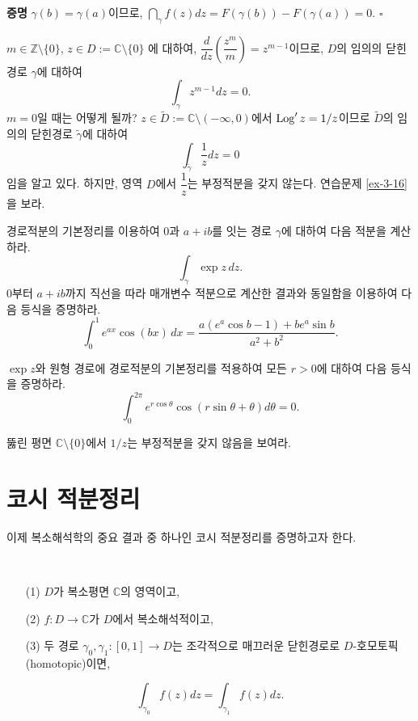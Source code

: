 {\bf 증명}
$\gamma(b)=\gamma(a)$이므로,
$\dint_\gamma f(z)dz = F(\gamma(b)) - F(\gamma(a)) = 0$.
\hfill $\square$

\begin{salt_example}\label{example-3-7}
$m\in\mathbb Z\setminus \{0\}$, $z\in D:=\mathbb C \setminus\{0\}$
에 대하여, 
$\dfrac d{dz}\left( \dfrac{z^m}m\right) = z^{m-1}$이므로,
$D$의 임의의 닫힌경로 $\gamma$에 대하여
\[
\int_\gamma z^{m-1}dz = 0.
\]
$m=0$일 때는 어떻게 될까?
$z\in\tilde D:= \mathbb C \setminus (-\infty,0)$에서
$\mathop{\mathrm{Log}}' z = 1/z$이므로 $\tilde D$의 임의의 닫힌경로 $\tilde \gamma$에 대하여
\[
\int_{\tilde\gamma} \frac1z dz = 0
\]
임을 알고 있다. 하지만, 영역 $D$에서 $\dfrac 1z$는 부정적분을 갖지 않는다.
연습문제 \ref{ex-3-16}을 보라.
\end{salt_example}

\begin{salt_exercise} \label{ex-3-14}
경로적분의 기본정리를 이용하여 
$0$과 $a+ib$를 잇는 경로 $\gamma$에 대하여
다음 적분을 계산하라.
\[
\int_\gamma \exp z \, dz.
\]
$0$부터 $a+ib$까지 직선을 따라 매개변수 적분으로 계산한 결과와 동일함을 이용하여
다음 등식을 증명하라.
\[
\int_0^1 e^{ax}\cos(bx)\, dx = \dfrac{a(e^a\cos b - 1) + be^a\sin b}{a^2+b^2}.
\]
\end{salt_exercise}

\begin{salt_exercise} \label{ex-3-15}
$\exp z$와 원형 경로에 경로적분의 기본정리를 적용하여
모든 $r>0$에 대하여 다음 등식을 증명하라.
\[
\int_0^{2\pi} e^{r\cos\theta} \cos(r\sin\theta+\theta)d\theta = 0.
\]
\end{salt_exercise}

\begin{salt_exercise} \label{ex-3-16}
뚫린 평면 $\mathbb C\setminus \{0\}$에서 $1/z$는 부정적분을 갖지 않음을 보여라.
\end{salt_exercise}

\section{코시 적분정리}

이제 복소해석학의 중요 결과 중 하나인 코시 적분정리를 증명하고자 한다.

\begin{salt_theorem} [코시 적분정리] \label{thm-3-4}
\
\begin{itemize}
\item[(1)] $D$가 복소평면 $\mathbb C$의 영역이고,
\item[(2)] $f:D\to\mathbb C$가 $D$에서 복소해석적이고,
\item[(3)] 두 경로 $\gamma_0, \gamma_1 :[0,1]\to D$는  조각적으로 매끄러운 닫힌경로로
$D$-호모토픽(homotopic)이면,
\end{itemize}
\[
\int_{\gamma_0} f(z)dz = \int_{\gamma_1} f(z)dz.
\]
\end{salt_theorem}

